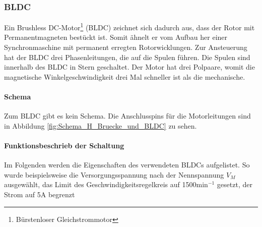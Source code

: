 \subsubsection{BLDC}
\label{subsubsec:BLDC}

Ein Brushless DC-Motor\footnote{Bürstenloser Gleichstrommotor} (BLDC) zeichnet sich dadurch aus, dass der Rotor mit Permanentmagneten bestückt ist. Somit ähnelt er vom Aufbau her einer Synchronmaschine mit permanent erregten Rotorwicklungen. Zur Ansteuerung hat der BLDC drei Phasenleitungen, die auf die Spulen führen. Die Spulen sind innerhalb des BLDC in Stern geschaltet. Der Motor hat drei Polpaare, womit die magnetische Winkelgeschwindigkeit drei Mal schneller ist als die mechanische.

\paragraph{Schema}\mbox{}

Zum BLDC gibt es kein Schema. Die Anschlusspins für die Motorleitungen sind in Abbildung \ref{fig:Schema_H_Bruecke_und_BLDC} zu sehen.

\paragraph{Funktionsbeschrieb der Schaltung}\mbox{}

Im Folgenden werden die Eigenschaften des verwendeten BLDCs aufgelistet. So wurde beispielsweise die Versorgungsspannung nach der Nennspannung $V_M$ ausgewählt, das Limit des Geschwindigkeitsregelkreis auf 1500min$^{-1}$ gesetzt, der Strom auf 5A begrenzt \cite[S.36]{akm_servomotoren_2020}


